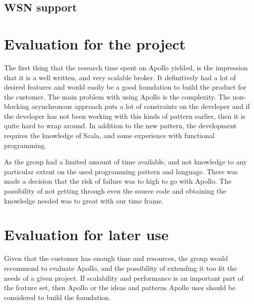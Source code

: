 \subsection{WSN support}

\section{Evaluation for the project}
The first thing that the research time spent on Apollo yielded, is the impression that it is a well written, and very scalable broker.
It definitively had a lot of desired features and would easily be a good foundation to build the product for the customer. The main problem with using Apollo is the complexity. The non-blocking asynchronous approach puts a lot of constraints on the developer and if the developer has not been working with this kinds of pattern earlier, then it is quite hard to wrap around. In addition to the new pattern, the development requires the knowledge of Scala, and some experience with functional programming. 

As the group had a limited amount of time available, and not knowledge to any particular extent on the used programming pattern and language. There was made a decision that the risk of failure was to high to go with Apollo. The possibility of not getting through even the source code and obtaining the knowledge needed was to great with our time frame. 

\section{Evaluation for later use}
Given that the customer has enough time and resources, the group would recommend to evaluate Apollo, and the possibility of extending it too fit the needs of a given project. If scalability and performance is an important part of the feature set, then Apollo or the ideas and patterns Apollo uses should be considered to build the foundation.

\clearpage
